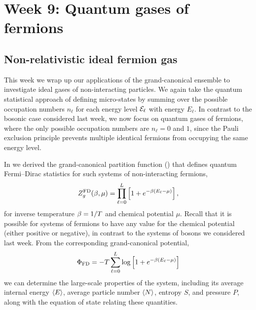 \renewcommand{\thisweek}{MATH327 Week 9}
\renewcommand{\moddate}{Last modified 24 Apr.~2021}
\setcounter{section}{9}
\setcounter{subsection}{0}
{}
\section*{Week 9: Quantum gases of fermions}
\subsection{\label{sec:fermi_nonrel}Non-relativistic ideal fermion gas}
This week we wrap up our applications of the grand-canonical ensemble to investigate ideal gases of non-interacting particles.
We again take the quantum statistical approach of defining micro-states by summing over the possible occupation numbers $n_{\ell}$ for each energy level $\mathcal E_{\ell}$ with energy $E_{\ell}$.
In contrast to the bosonic case considered last week, we now focus on quantum gases of fermions, where the only possible occupation numbers are $n_{\ell} = 0$ and $1$, since the Pauli exclusion principle prevents multiple identical fermions from occupying the same energy level.

In  we derived the grand-canonical partition function () that defines quantum Fermi--Dirac statistics for such systems of non-interacting fermions,
\begin{equation*}
  Z_g^{\text{FD}}(\beta, \mu) = \prod_{\ell = 0}^L \left[1 + e^{-\beta (E_{\ell} - \mu)}\right],
\end{equation*}
for inverse temperature $\beta = 1 / T$ and chemical potential $\mu$.
Recall that it is possible for systems of fermions to have any value for the chemical potential (either positive or negative), in contrast to the systems of bosons we considered last week.
From the corresponding grand-canonical potential,
\begin{equation*}
  \Phi_{\text{FD}} = -T \sum_{\ell = 0}^L \log\left[1 + e^{-\beta (E_{\ell} - \mu)}\right]
\end{equation*}
we can determine the large-scale properties of the system, including its average internal energy $\left\langle E \right\rangle$, average particle number $\left\langle N \right\rangle$, entropy $S$, and pressure $P$, along with the equation of state relating these quantities.

